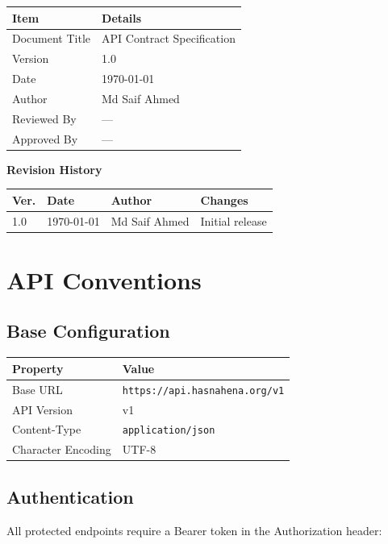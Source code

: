 \documentclass[11pt,a4paper]{article}
\newcommand{\DocumentTitle}{API Contract Specification}
\newcommand{\DocumentVersion}{1.0}
\newcommand{\DocumentDate}{\today}
\begin{document}
\begin{tabular}{@{}p{3cm}p{10cm}@{}}
\toprule
\textbf{Item} & \textbf{Details} \\
\midrule
Document Title & \DocumentTitle \\
Version & \DocumentVersion \\
Date & \DocumentDate \\
Author & Md Saif Ahmed \\
Reviewed By & --- \\
Approved By & --- \\
\bottomrule
\end{tabular}

\vspace{1em}

\textbf{Revision History}

\begin{tabular}{@{}p{1.2cm}p{2.5cm}p{3.5cm}p{5.5cm}@{}}
\toprule
\textbf{Ver.} & \textbf{Date} & \textbf{Author} & \textbf{Changes} \\
\midrule
1.0 & \DocumentDate & Md Saif Ahmed & Initial release \\
\bottomrule
\end{tabular}

\newpage

\section{API Conventions}

\subsection{Base Configuration}

\begin{tabular}{@{}p{4cm}p{9cm}@{}}
\toprule
\textbf{Property} & \textbf{Value} \\
\midrule
Base URL & \texttt{https://api.hasnahena.org/v1} \\
API Version & v1 \\
Content-Type & \texttt{application/json} \\
Character Encoding & UTF-8 \\
\bottomrule
\end{tabular}

\subsection{Authentication}
All protected endpoints require a Bearer token in the Authorization header:
\end{document}
